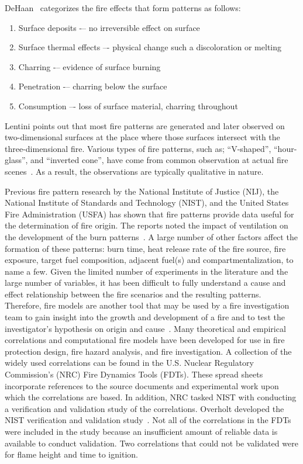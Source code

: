 \documentclass[twoside]{uocthesis}
\begin{document}
DeHaan~\cite{DeHaan:2012} categorizes the fire effects that form patterns as follows:
\begin{enumerate}
\item Surface deposits -– no irreversible effect on surface
\item Surface thermal effects –- physical change such a discoloration or melting
\item Charring -– evidence of surface burning
\item Penetration -– charring below the surface
\item Consumption –- loss of surface material, charring throughout
\end{enumerate}
Lentini points out that most fire patterns are generated and later observed on two-dimensional surfaces at the place where those surfaces intersect with the three-dimensional fire. Various types of fire patterns, such as; ``V-shaped'', ``hour-glass'', and ``inverted cone'', have come from common observation at actual fire scenes~\cite{Lentini:2006}.  As a result, the observations are typically qualitative in nature.

Previous fire pattern research by the National Institute of Justice (NIJ), the National Institute of Standards and Technology (NIST), and the United States Fire Administration (USFA) has shown that fire patterns provide data useful for the determination of fire origin.  The reports noted the impact of ventilation on the development of the burn patterns~\cite{Shanley:1997,Putorti:1997}. A large number of other factors affect the formation of these patterns: burn time, heat release rate of the fire source, fire exposure, target fuel composition, adjacent fuel(s) and compartmentalization, to name a few. Given the limited number of experiments in the literature and the large number of variables, it has been difficult to fully understand a cause and effect relationship between the fire scenarios and the resulting patterns.  Therefore, fire models are another tool that may be used by a fire investigation team to gain insight into the growth and development of a fire and to test the investigator’s hypothesis on origin and cause~\cite{Sutula}.  Many theoretical and empirical correlations and computational fire models have been developed for use in fire protection design, fire hazard analysis, and fire investigation.  A collection of the widely used correlations can be found in the U.S. Nuclear Regulatory Commission’s (NRC) Fire Dynamics Tools (FDTs). These spread sheets incorporate references to the source documents and experimental work upon which the correlations are based. In addition, NRC tasked NIST with conducting a verification and validation study of the correlations. Overholt developed the NIST verification and validation study~\cite{Overholt:2014}. Not all of the correlations in the FDTs were included in the study because an insufficient amount of reliable data is available to conduct validation.  Two correlations that could not be validated were for flame height and time to ignition.
\end{document}

